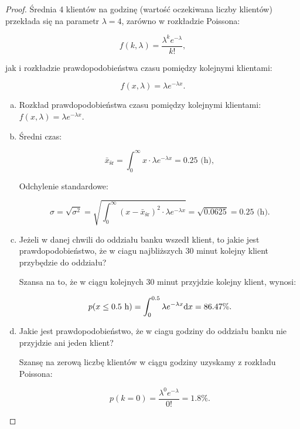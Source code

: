 \documentclass[11pt]{article}
\theoremstyle{definition}
\numberwithin{zadanie}{section}
\begin{document}
\begin{proof}

    Średnia 4 klientów na godzinę (wartość oczekiwana liczby klientów) przekłada się na parametr $\lambda=4$, zarówno w rozkładzie Poissona:

    $$f(k,\lambda) = \frac{\lambda^ke^{-\lambda}}{k!},$$

    jak i rozkładzie prawdopodobieństwa czasu pomiędzy kolejnymi klientami:

    $$f(x, \lambda) = \lambda e^{-\lambda x}.$$

    \begin{enumerate}[a)]
        \item Rozkład prawdopodobieństwa czasu pomiędzy kolejnymi klientami: $f(x,\lambda) = \lambda e^{-\lambda x}.$
        \item Średni czas:

              $$\bar x_\text{śr} = \int_0^\infty x\cdot \lambda e^{-\lambda x} = 0.25 \text{ (h)},$$

              Odchylenie standardowe:

              $$\sigma =\sqrt{\sigma^2}= \sqrt{\int_0^\infty (x - \bar x_\text{śr} )^2\cdot\lambda e^{-\lambda x} }= \sqrt{0.0625} = 0.25 \text{ (h)}.$$

        \item Jeżeli w danej chwili do oddziału banku wszedł klient, to jakie jest prawdopodobieństwo, że w ciagu najbliższych 30 minut kolejny klient przybędzie do oddziału?

              Szansa na to, że w ciągu kolejnych 30 minut przyjdzie kolejny klient, wynosi:

              $$p(x\leq 0.5\text{ h}) = \int_0^{0.5}\lambda e^{-\lambda x}\text dx = 86.47\%.$$

        \item Jakie jest prawdopodobieństwo, że w ciagu godziny do oddziału banku nie przyjdzie ani jeden klient?

              Szansę na zerową liczbę klientów w ciągu godziny uzyskamy z rozkładu Poissona:

              $$p(k=0) = \frac{\lambda^0e^{-\lambda}}{0!} = 1.8\%.$$
    \end{enumerate}
\end{proof}
\end{document}
